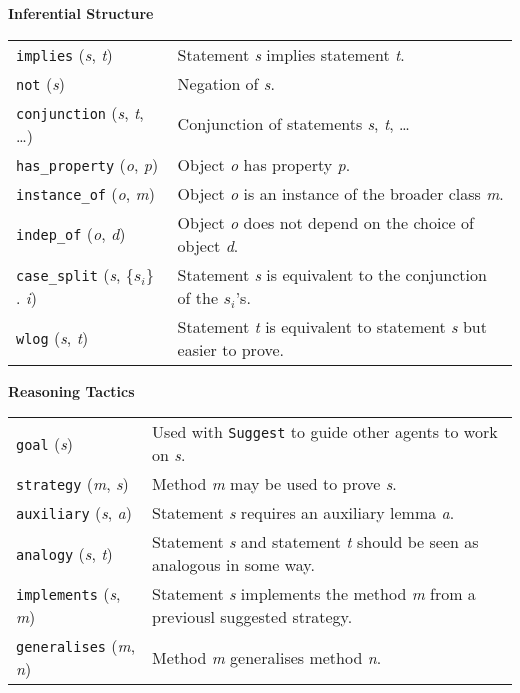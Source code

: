 \begin{table}[ht]
\begin{mdframed}
{\centering
\textbf{Inferential Structure}

\par}

\smallskip

\noindent
\begin{tabular}{@{\hspace{-.25ex}}p{}p{}}
\texttt{implies} (\emph{s}, \emph{t}) & Statement \emph{s} implies statement \emph{t}.\\
\texttt{not} (\emph{s}) & Negation of \emph{s}.\\
\texttt{conjunction} (\emph{s}, \emph{t}, \ldots) & Conjunction of statements \emph{s}, \emph{t}, \ldots \\
\texttt{has\_property} (\emph{o}, \emph{p}) & Object \emph{o} has property \emph{p}.\\
\texttt{instance\_of} (\emph{o}, \emph{m}) & Object \emph{o} is an instance of the broader class \emph{m}.\\
\texttt{indep\_of} (\emph{o}, \emph{d}) & Object \emph{o} does not depend on the choice of object \emph{d}.\\
\texttt{case\_split} (\emph{s}, \{$s_i$\} . \emph{i}) & Statement \emph{s} is equivalent to the conjunction of the $s_i$'s.\\
\texttt{wlog} (\emph{s}, \emph{t}) & Statement \emph{t} is equivalent to statement \emph{s} but easier to prove.\\
\end{tabular}

\medskip

{\centering
\textbf{Reasoning Tactics}

\par}

\smallskip

\noindent
\begin{tabular}{@{\hspace{-.25ex}}p{}p{}}
\texttt{goal} (\emph{s}) & Used with \texttt{Suggest} to guide other agents to work on \emph{s}.\\
\texttt{strategy} (\emph{m}, \emph{s}) & Method \emph{m} may be used to prove \emph{s}.\\
\texttt{auxiliary} (\emph{s}, \emph{a}) & Statement \emph{s} requires an auxiliary lemma \emph{a}.\\
\texttt{analogy} (\emph{s}, \emph{t}) & Statement \emph{s} and statement \emph{t} should be seen as analogous in some way.\\
\texttt{implements} (\emph{s}, \emph{m}) & Statement \emph{s} implements the method \emph{m} from a previousl suggested strategy.\\
\texttt{generalises} (\emph{m}, \emph{n}) & Method \emph{m} generalises method \emph{n}.  \\
\end{tabular}


\end{mdframed}
\end{table}
